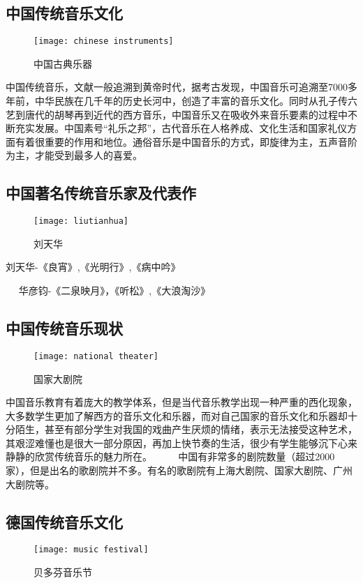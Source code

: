 \subsection{中国传统音乐文化}
\begin{figure}[htb]
    \centering
    \texttt{[image: chinese instruments]}
    \caption{中国古典乐器}
\end{figure}

    中国传统音乐，文献一般追溯到黄帝时代，据考古发现，中国音乐可追溯至7000多年前，中华民族在几千年的历史长河中，创造了丰富的音乐文化。同时从孔子传六艺到唐代的胡琴再到近代的西方音乐，中国音乐又在吸收外来音乐要素的过程中不断充实发展。中国素号“礼乐之邦”，古代音乐在人格养成、文化生活和国家礼仪方面有着很重要的作用和地位。通俗音乐是中国音乐的方式，即旋律为主，五声音阶为主，才能受到最多人的喜爱。 

\subsection{中国著名传统音乐家及代表作}
\begin{figure}[htb]
    \centering
    \texttt{[image: liutianhua]}
    \caption{刘天华}
\end{figure}
    刘天华-《良宵》,《光明行》,《病中吟》 

    华彦钧-《二泉映月》，《听松》,《大浪淘沙》 

\subsection{中国传统音乐现状}
\begin{figure}[htb]
    \centering
    \texttt{[image: national theater]}
    \caption{国家大剧院}
\end{figure}

    中国音乐教育有着庞大的教学体系，但是当代音乐教学出现一种严重的西化现象，大多数学生更加了解西方的音乐文化和乐器，而对自己国家的音乐文化和乐器却十分陌生，甚至有部分学生对我国的戏曲产生厌烦的情绪，表示无法接受这种艺术，其艰涩难懂也是很大一部分原因，再加上快节奏的生活，很少有学生能够沉下心来静静的欣赏传统音乐的魅力所在。 
    
    中国有非常多的剧院数量（超过2000家），但是出名的歌剧院并不多。有名的歌剧院有上海大剧院、国家大剧院、广州大剧院等。 

\subsection{德国传统音乐文化}
\begin{figure}[htb]
    \centering
    \texttt{[image: music festival]}
    \caption{贝多芬音乐节}
\end{figure}
    
